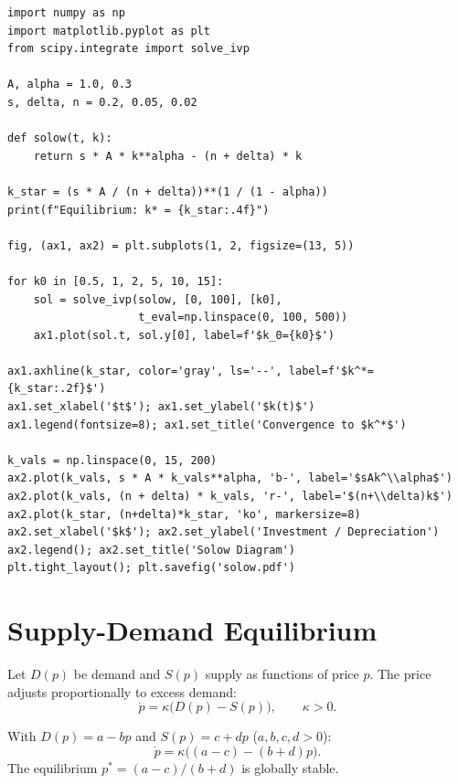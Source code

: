 \begin{codeblock}[title=\textbf{Solow model simulation}]
\begin{verbatim}
import numpy as np
import matplotlib.pyplot as plt
from scipy.integrate import solve_ivp

A, alpha = 1.0, 0.3
s, delta, n = 0.2, 0.05, 0.02

def solow(t, k):
    return s * A * k**alpha - (n + delta) * k

k_star = (s * A / (n + delta))**(1 / (1 - alpha))
print(f"Equilibrium: k* = {k_star:.4f}")

fig, (ax1, ax2) = plt.subplots(1, 2, figsize=(13, 5))

for k0 in [0.5, 1, 2, 5, 10, 15]:
    sol = solve_ivp(solow, [0, 100], [k0],
                    t_eval=np.linspace(0, 100, 500))
    ax1.plot(sol.t, sol.y[0], label=f'$k_0={k0}$')

ax1.axhline(k_star, color='gray', ls='--', label=f'$k^*={k_star:.2f}$')
ax1.set_xlabel('$t$'); ax1.set_ylabel('$k(t)$')
ax1.legend(fontsize=8); ax1.set_title('Convergence to $k^*$')

k_vals = np.linspace(0, 15, 200)
ax2.plot(k_vals, s * A * k_vals**alpha, 'b-', label='$sAk^\\alpha$')
ax2.plot(k_vals, (n + delta) * k_vals, 'r-', label='$(n+\\delta)k$')
ax2.plot(k_star, (n+delta)*k_star, 'ko', markersize=8)
ax2.set_xlabel('$k$'); ax2.set_ylabel('Investment / Depreciation')
ax2.legend(); ax2.set_title('Solow Diagram')
plt.tight_layout(); plt.savefig('solow.pdf')
\end{verbatim}
\end{codeblock}

\section{Supply-Demand Equilibrium}
\label{sec:supply_demand}

\begin{definition}
Let $D(p)$ be demand and $S(p)$ supply as functions of price $p$.
The price adjusts proportionally to excess demand:
\[
  \dot{p} = \kappa\bigl(D(p) - S(p)\bigr), \qquad \kappa > 0.
\]
\end{definition}

\begin{example}
With $D(p)=a-bp$ and $S(p)=c+dp$ ($a,b,c,d>0$):
\[
  \dot{p} = \kappa\bigl((a-c)-(b+d)p\bigr).
\]
The equilibrium $p^*=(a-c)/(b+d)$ is globally stable.
\end{example}

